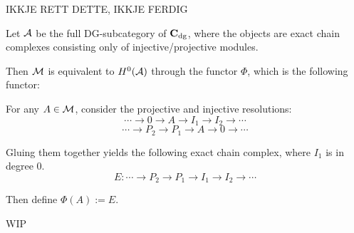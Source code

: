 {\color{red}
IKKJE RETT DETTE, IKKJE FERDIG

Let \( {\mathcal{A}} \) be the full DG-subcategory of \( \operatorname{\mathbf{C}}_{\operatorname{dg}} \), where the objects are exact chain complexes consisting only of injective/projective modules.

Then \( {\mathcal{M}} \) is equivalent to \( H^0({\mathcal{A}}) \) through the functor \( \Phi \), which is the following functor:

For any \( A \in {\mathcal{M}} \), consider the projective and injective resolutions:
\[
    \cdots \to 0 \to A \to I_1 \to I_2 \to \cdots
\]
\[
    \cdots \to P_2 \to P_1 \to A \to 0 \to \cdots
\]

Gluing them together yields the following exact chain complex, where \( I_1 \) is in degree \( 0 \).
\[
    E: \cdots \to P_2 \to P_1 \to I_1 \to I_2 \to \cdots
\]

Then define \( \Phi(A) := E \).

WIP
}







